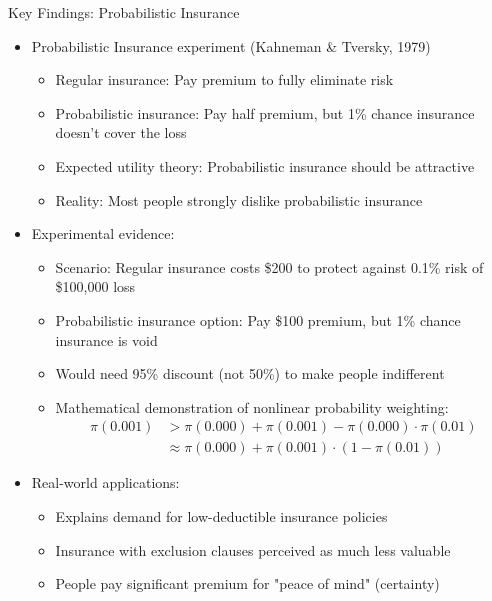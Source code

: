 \documentclass[10pt]{beamer}
\begin{document}
\begin{frame}{Key Findings: Probabilistic Insurance}
  \begin{itemize}[<+->]
    \item Probabilistic Insurance experiment (Kahneman \& Tversky, 1979)
      \begin{itemize}
        \item Regular insurance: Pay premium to fully eliminate risk
        \item Probabilistic insurance: Pay half premium, but 1\% chance insurance doesn't cover the loss
        \item Expected utility theory: Probabilistic insurance should be attractive
        \item Reality: Most people strongly dislike probabilistic insurance
      \end{itemize}
    \item Experimental evidence:
      \begin{itemize}
        \item Scenario: Regular insurance costs \$200 to protect against 0.1\% risk of \$100,000 loss
        \item Probabilistic insurance option: Pay \$100 premium, but 1\% chance insurance is void
        \item Would need 95\% discount (not 50\%) to make people indifferent
        \item Mathematical demonstration of nonlinear probability weighting:
          \begin{align*}
            \pi(0.001) &> \pi(0.000) + \pi(0.001) - \pi(0.000) \cdot \pi(0.01)\\
            &\approx \pi(0.000) + \pi(0.001) \cdot (1 - \pi(0.01))
          \end{align*}
      \end{itemize}
    \item Real-world applications:
      \begin{itemize}
        \item Explains demand for low-deductible insurance policies
        \item Insurance with exclusion clauses perceived as much less valuable
        \item People pay significant premium for "peace of mind" (certainty)
      \end{itemize}
  \end{itemize}
\end{frame}
\end{document}
